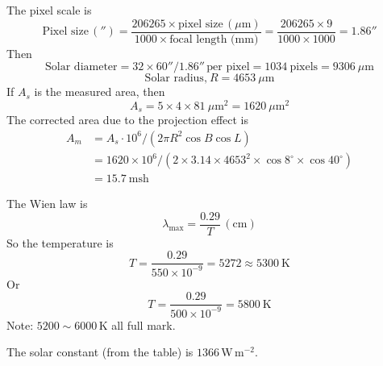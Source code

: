 
The pixel scale is
\begin{equation*}
\text{Pixel size}\,('') = \frac{206265 \times \text{pixel size}\,(\mu\mathrm{m})}{1000 \times \text{focal length (mm)}}
= \frac{206265 \times 9}{1000 \times 1000} = 1.86'' \tag*{(30\%)}
\end{equation*}
Then
\[
\text{Solar diameter} = 32 \times 60''/1.86''\,\text{per pixel} = 1034~\text{pixels} = 9306~\mu\mathrm{m}
\]
\begin{equation*}
\text{Solar radius,}\ R = 4653~\mu\mathrm{m} \tag*{(25\%)}
\end{equation*}
If $A_s$ is the measured area, then
\begin{equation*}
A_s = 5 \times 4 \times 81~\mu\mathrm{m}^2 = 1620~\mu\mathrm{m}^2 \tag*{(15\%)}
\end{equation*}
The corrected area due to the projection effect is
\begin{align*}
A_m &= A_s \cdot 10^6/(2\pi R^2 \cos B \cos L)\\
    &= 1620 \times 10^6/(2 \times 3.14 \times 4653^2 \times \cos 8^\circ \times \cos 40^\circ)\\
    &= 15.7~\mathrm{msh} \tag*{(30\%)}
\end{align*}

The Wien law is
\begin{equation*}
\lambda_{\max} = \frac{0.29}{T}\,(\mathrm{cm}) \tag*{5}
\end{equation*}
So the temperature is
\begin{equation*}
T = \frac{0.29}{550\times 10^{-9}} = 5272 \approx 5300~\mathrm{K} \tag*{5}
\end{equation*}
Or
\[
T = \frac{0.29}{500\times 10^{-9}} = 5800~\mathrm{K}
\]
Note: $5200\sim6000$\,K all full mark.

The solar constant (from the table) is $1366$\,W\,m$^{-2}$.

